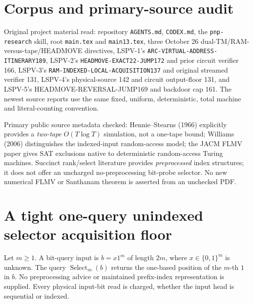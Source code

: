 \documentclass[11pt]{article}
\begin{document}
\section{Corpus and primary-source audit}
Original project material read: repository \texttt{AGENTS.md}, \texttt{CODEX.md}, the
\texttt{pnp-research} skill, root \texttt{main.tex} and \texttt{main13.tex}, three
October 26 dual-TM/RAM-versus-tape/HEADMOVE directives, LSPV-1's
\texttt{ARC-VIRTUAL-ADDRESS-ITINERARY189}, LSPV-2's
\texttt{HEADMOVE-EXACT22-JUMP172} and prior circuit verifier 166,
LSPV-3's \texttt{RAM-INDEXED-LOCAL-ACQUISITION137} and original
streamed verifier 131, LSPV-4's physical-source 142 and circuit
output-floor 131, and LSPV-5's HEADMOVE-REVERSAL-JUMP169 and
backdoor cap 161. The newest source reports use the same fixed,
uniform, deterministic, total machine and literal-counting convention.

Primary public source metadata checked: Hennie--Stearns (1966) explicitly
provides a \emph{two-tape} \(O(T\log T)\) simulation, not a one-tape bound;
Williams (2006) distinguishes the indexed-input random-access model;
the JACM FLMV paper gives SAT exclusions native to deterministic
random-access Turing machines. Succinct rank/select literature provides
\emph{preprocessed} index structures; it does not offer an uncharged
no-preprocessing bit-probe selector. No new numerical FLMV or
Santhanam theorem is asserted from an unchecked PDF.

\section{A tight one-query unindexed selector acquisition floor}
Let \(m\ge1\). A bit-query input is \(b=x1^m\) of length \(2m\), where
\(x\in\{0,1\}^m\) is unknown. The query
\(\operatorname{Select}_m(b)\) returns the one-based position of the
\(m\)-th \(1\) in \(b\). No preprocessing advice or maintained prefix-index
representation is supplied. Every physical input-bit read is charged,
whether the input head is sequential or indexed.
\end{document}
